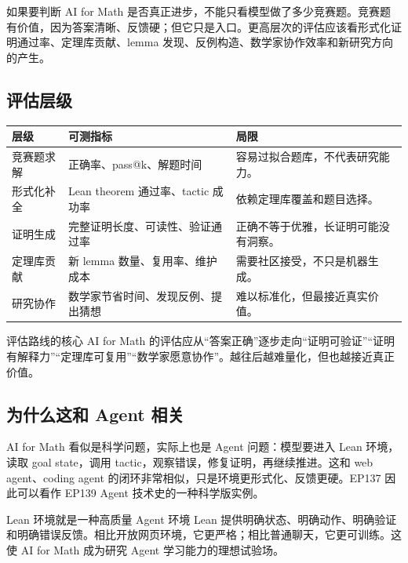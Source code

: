\documentclass[a4paper]{article}
\begin{document}
如果要判断 AI for Math 是否真正进步，不能只看模型做了多少竞赛题。竞赛题有价值，因为答案清晰、反馈硬；但它只是入口。更高层次的评估应该看形式化证明通过率、定理库贡献、lemma 发现、反例构造、数学家协作效率和新研究方向的产生。

\subsection{评估层级}

\noindent\begin{longtable}{p{}p{}p{}}
\toprule
层级 & 可测指标 & 局限 \\
\midrule
竞赛题求解 & 正确率、pass@k、解题时间 & 容易过拟合题库，不代表研究能力。 \\
形式化补全 & Lean theorem 通过率、tactic 成功率 & 依赖定理库覆盖和题目选择。 \\
证明生成 & 完整证明长度、可读性、验证通过率 & 正确不等于优雅，长证明可能没有洞察。 \\
定理库贡献 & 新 lemma 数量、复用率、维护成本 & 需要社区接受，不只是机器生成。 \\
研究协作 & 数学家节省时间、发现反例、提出猜想 & 难以标准化，但最接近真实价值。 \\
\bottomrule
\end{longtable}

\begin{importantbox}{评估路线的核心}
AI for Math 的评估应从“答案正确”逐步走向“证明可验证”“证明有解释力”“定理库可复用”“数学家愿意协作”。越往后越难量化，但也越接近真正价值。
\end{importantbox}

\subsection{为什么这和 Agent 相关}

AI for Math 看似是科学问题，实际上也是 Agent 问题：模型要进入 Lean 环境，读取 goal state，调用 tactic，观察错误，修复证明，再继续推进。这和 web agent、coding agent 的闭环非常相似，只是环境更形式化、反馈更硬。EP137 因此可以看作 EP139 Agent 技术史的一种科学版实例。

\begin{knowledgebox}{Lean 环境就是一种高质量 Agent 环境}
Lean 提供明确状态、明确动作、明确验证和明确错误反馈。相比开放网页环境，它更严格；相比普通聊天，它更可训练。这使 AI for Math 成为研究 Agent 学习能力的理想试验场。
\end{knowledgebox}
\end{document}
